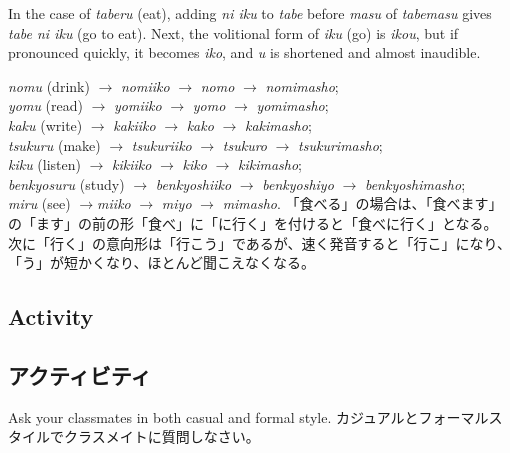 \documentclass[uplatex,dvipdfmx,b5paper,english,10pt]{jsbook}
\begin{document}
\begin{toianswer}
\ifEnglish
In the case of {\it taberu\/} (eat), adding {\it ni iku\/} to {\it tabe\/} before {\it masu\/} of {\it tabemasu\/} gives {\it tabe ni iku\/} (go to eat).
Next, the volitional form of {\it iku\/} (go) is {\it ikou\/}, but if pronounced quickly, it becomes {\it iko\/}, and {\it u\/} is shortened and almost inaudible.

 {\it nomu\/} (drink) $\rightarrow$ {\it nomiiko\/} $\rightarrow$ {\it nomo\/} $\rightarrow$ {\it nomimasho\/};\\
 {\it yomu\/} (read) $\rightarrow$ {\it yomiiko\/} $\rightarrow$ {\it yomo\/} $\rightarrow$ {\it yomimasho\/};\\
 {\it kaku\/} (write) $\rightarrow$ {\it kakiiko\/} $\rightarrow$ {\it kako\/} $\rightarrow$ {\it kakimasho\/};\\
 {\it tsukuru\/} (make) $\rightarrow$ {\it tsukuriiko\/} $\rightarrow$ {\it tsukuro\/} $\rightarrow$ {\it tsukurimasho\/};\\
 {\it kiku\/} (listen) $\rightarrow$ {\it kikiiko\/} $\rightarrow$ {\it kiko\/} $\rightarrow$ {\it kikimasho\/};\\
 {\it benkyosuru\/} (study) $\rightarrow$ {\it benkyoshiiko\/} $\rightarrow$ {\it benkyoshiyo\/} $\rightarrow$ {\it benkyoshimasho\/};\\
 {\it miru\/} (see) $\rightarrow${\it miiko\/} $\rightarrow$ {\it miyo\/} $\rightarrow$ {\it mimasho\/}.
\else
「食べる」の場合は、「食べます」の「ます」の前の形「食べ」に「に行く」を付けると「食べに行く」となる。
次に「行く」の意向形は「行こう」であるが、速く発音すると「行こ」になり、「う」が短かくなり、ほとんど聞こえなくなる。
\fi
\end{toianswer}

\ifEnglish
\subsection{Activity}
\else
\subsection{アクティビティ}
\fi

\begin{toiquestion}
\ifEnglish
Ask your classmates in both casual and formal style.
\else
カジュアルとフォーマルスタイルでクラスメイトに質問しなさい。
\fi
\end{toiquestion}
\end{document}
